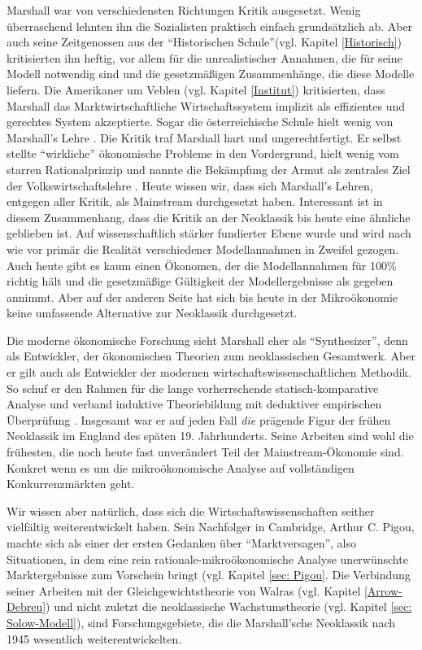 Marshall war von verschiedensten Richtungen Kritik ausgesetzt. Wenig überraschend lehnten ihn die Sozialisten praktisch einfach grundsätzlich ab. Aber auch seine Zeitgenossen aus der "`Historischen Schule"'(vgl. Kapitel \ref{Historisch}) kritisierten ihn heftig, vor allem für die unrealistischer Annahmen, die für seine Modell notwendig sind und die gesetzmäßigen Zusammenhänge, die diese Modelle liefern. Die Amerikaner um Veblen (vgl. Kapitel \ref{Institut}) kritisierten, dass Marshall das Marktwirtschaftliche Wirtschaftssystem implizit als effizientes und gerechtes System akzeptierte. Sogar die österreichische Schule hielt wenig von Marshall's Lehre \parencite[S. 151]{Rieter1989}. Die Kritik traf Marshall hart und ungerechtfertigt. Er selbst stellte "`wirkliche"' ökonomische Probleme in den Vordergrund, hielt wenig vom starren Rationalprinzip und nannte die Bekämpfung der Armut als zentrales Ziel der Volkswirtschaftslehre \parencite{Rieter1989}. Heute wissen wir, dass sich Marshall's Lehren, entgegen aller Kritik, als Mainstream durchgesetzt haben. Interessant ist in diesem Zusammenhang, dass die Kritik an der Neoklassik bis heute eine ähnliche geblieben  ist. Auf wissenschaftlich stärker fundierter Ebene wurde und wird nach wie vor primär die Realität verschiedener Modellannahmen in Zweifel gezogen. Auch heute gibt es kaum einen Ökonomen, der die Modellannahmen für 100\% richtig hält und die gesetzmäßige Gültigkeit der Modellergebnisse als gegeben annimmt. Aber auf der anderen Seite hat sich bis heute in der Mikroökonomie keine umfassende Alternative zur Neoklassik durchgesetzt.  

Die moderne ökonomische Forschung \parencite{Ekelund2002, Blaug2001, Humphrey1992} sieht Marshall eher als "`Synthesizer"', denn als Entwickler, \parencite[S. 212]{Ekelund2002} der ökonomischen Theorien zum neoklassischen Gesamtwerk. Aber er gilt auch als Entwickler der modernen wirtschaftswissenschaftlichen Methodik. So schuf er den Rahmen für die lange vorherrschende statisch-komparative Analyse und verband induktive Theoriebildung mit deduktiver empirischen Überprüfung \parencite[S. 212]{Ekelund2002}. Insgesamt war er auf jeden Fall \textit{die} prägende Figur der frühen Neoklassik im England des späten 19. Jahrhunderts. Seine Arbeiten sind wohl die frühesten, die noch heute fast unverändert Teil der Mainstream-Ökonomie sind. Konkret wenn es um die mikroökonomische Analyse auf vollständigen Konkurrenzmärkten geht. 

Wir wissen aber natürlich, dass sich die Wirtschaftswissenschaften seither vielfältig weiterentwickelt haben. Sein Nachfolger in Cambridge, Arthur C. Pigou, machte sich als einer der ersten Gedanken über "`Marktversagen"', also Situationen, in dem eine rein rationale-mikroökonomische Analyse unerwünschte Marktergebnisse zum Vorschein bringt (vgl. Kapitel \ref{sec: Pigou}. Die Verbindung seiner Arbeiten mit der Gleichgewichtstheorie von Walras (vgl. Kapitel \ref{Arrow-Debreu}) und nicht zuletzt die neoklassische Wachstumstheorie (vgl. Kapitel \ref{sec: Solow-Modell}), sind Forschungsgebiete, die die Marshall'sche Neoklassik nach 1945 wesentlich weiterentwickelten.



